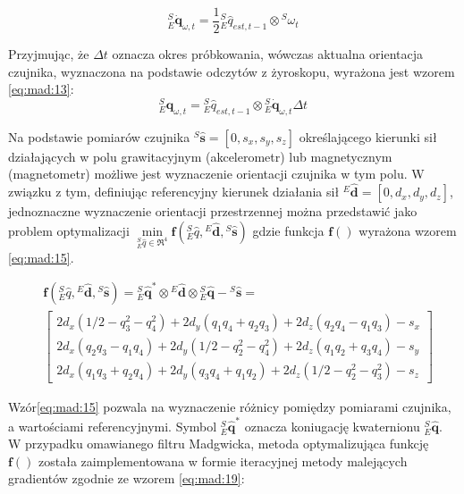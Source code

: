 \begin{equation}
	^S_E\dot{\mathbf{q}}_{\omega,t} = \frac{1}{2}{^S_E \hat{q}_{est, t-1}}\otimes {^S{\omega_t}}
	\label{eq:mad:12}
\end{equation}

Przyjmując, że $\Delta t$ oznacza okres próbkowania, wówczas aktualna orientacja czujnika, wyznaczona na podstawie odczytów z żyroskopu, wyrażona jest wzorem \ref{eq:mad:13}:
\begin{equation}
	^S_E{\mathbf{q}}_{\omega,t} = {^S_E \hat{q}_{est, t-1}}\otimes {^S_E\dot{\mathbf{q}}_{\omega,t}}\Delta t
\end{equation}	

Na podstawie pomiarów czujnika ${^S\hat{\mathbf{s}}} = [0,s_x,s_y,s_z]$ określającego kierunki sił działających w polu grawitacyjnym (akcelerometr) lub magnetycznym (magnetometr)  możliwe jest wyznaczenie orientacji czujnika w tym polu. W związku z tym, definiując referencyjny kierunek działania sił ${^E\hat{\mathbf{d}}} = [0,d_x,d_y,d_z]$, jednoznaczne wyznaczenie orientacji przestrzennej można przedstawić jako problem optymalizacji $\underset{{^S_E \hat{q}} \in \Re^4}{\min} \mathbf{f}({^S_E \hat{q}},{^E\hat{\mathbf{d}}} , {^S\hat{\mathbf{s}}})$ gdzie funkcja $\mathbf{f}()$ wyrażona wzorem \ref{eq:mad:15}.

\begin{equation}
	\begin{split}
		&\mathbf{f}({^S_E \hat{q}},{^E\hat{\mathbf{d}}} , {^S\hat{\mathbf{s}}}) = {^S_E \hat{\mathbf{q}}}^* \otimes {^E\hat{\mathbf{d}}} \otimes {^S_E \hat{\mathbf{q}}} - {^S\hat{\mathbf{s}}} = \\
		&\begin{bmatrix}
		2d_x(1/2 - q_3^2 - q_4^2) + 2d_y(q_1 q_4 + q_2 q_3)+2d_z(q_2 q_4 - q_1 q_3) - s_x \\
		2d_x(q_2 q_3 - q_1 q_4) + 2d_y(1/2 - q_2^2 - q_4^2)+2d_z(q_1 q_2 + q_3 q_4) - s_y \\
		2d_x(q_1 q_3 + q_2 q_4) + 2d_y(q_3 q_4 + q_1 q_2)+2d_z(1/2 - q_2^2 - q_3^2) - s_z 
		\end{bmatrix}
	\end{split}
	\label{eq:mad:15}
\end{equation}

Wzór\ref{eq:mad:15} pozwala na wyznaczenie różnicy pomiędzy pomiarami czujnika, a wartościami referencyjnymi. Symbol ${^S_E \hat{\mathbf{q}}}^*$ oznacza koniugację kwaternionu ${^S_E \hat{\mathbf{q}}}$.
W przypadku omawianego filtru Madgwicka, metoda optymalizująca funkcję $\mathbf{f}()$ została zaimplementowana w formie iteracyjnej metody malejących gradientów zgodnie ze wzorem \ref{eq:mad:19}:

